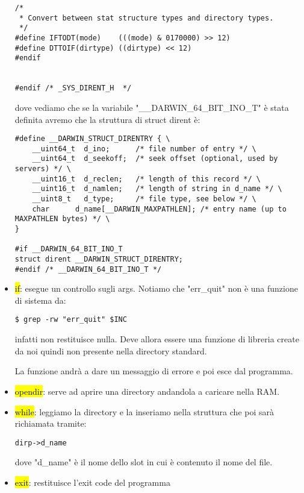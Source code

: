 \begin{itemize}
\begin{lstlisting}
/*
 * Convert between stat structure types and directory types.
 */
#define IFTODT(mode)    (((mode) & 0170000) >> 12)
#define DTTOIF(dirtype) ((dirtype) << 12)
#endif


#endif /* _SYS_DIRENT_H  */
\end{lstlisting}

		dove vediamo che se la variabile "\_\_DARWIN\_64\_BIT\_INO\_T" è stata definita avremo che la struttura di struct dirent è:
		
\begin{lstlisting}
#define __DARWIN_STRUCT_DIRENTRY { \
	__uint64_t  d_ino;      /* file number of entry */ \
	__uint64_t  d_seekoff;  /* seek offset (optional, used by servers) */ \
	__uint16_t  d_reclen;   /* length of this record */ \
	__uint16_t  d_namlen;   /* length of string in d_name */ \
	__uint8_t   d_type;     /* file type, see below */ \
	char      d_name[__DARWIN_MAXPATHLEN]; /* entry name (up to MAXPATHLEN bytes) */ \
}

#if __DARWIN_64_BIT_INO_T
struct dirent __DARWIN_STRUCT_DIRENTRY;
#endif /* __DARWIN_64_BIT_INO_T */
\end{lstlisting}

		
	\item \hl{if}: esegue un controllo sugli args. Notiamo che "err\_quit" non è una funzione di sistema da:
	
\begin{lstlisting}
$ grep -rw "err_quit" $INC
\end{lstlisting}

		infatti non restituisce nulla. Deve allora essere una funzione di libreria create da noi quindi non presente nella directory standard.
		
		La funzione andrà a dare un messaggio di errore e poi esce dal programma.
		
		
	\item \hl{opendir}: serve ad aprire una directory andandola a caricare nella RAM. 
	
	\item \hl{while}: leggiamo la directory e la inseriamo nella struttura che poi sarà richiamata tramite:
	
\begin{lstlisting}
dirp->d_name
\end{lstlisting}

		dove "d\_name" è il nome dello slot in cui è contenuto il nome del file.
		
		
	\item \hl{exit}: restituisce l'exit code del programma
	
\end{itemize}


